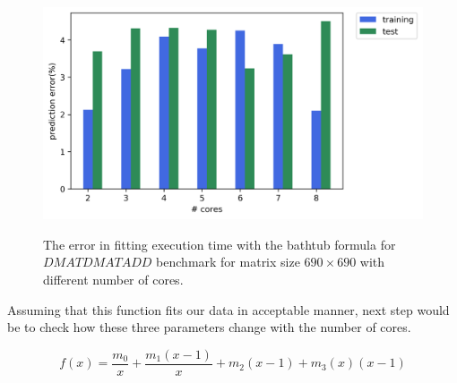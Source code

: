 \vspace{\baselineskip}	
\begin{figure}[H]
	\centering
	{\includegraphics[scale=.45]{images/bathtub/error_690.png}}	
	\caption{The error in fitting execution time with the bathtub formula for $DMATDMATADD$ benchmark for matrix size $690\times690$ with different number of cores.}	
	\label{fig23}
\end{figure}

\vspace{\baselineskip}	
Assuming that this function fits our data in acceptable manner, next step would be to check how these three parameters change with the number of cores.

\begin{equation}\label{usl_fit}
f(x)=\frac{m_0}{x}+\frac{m_1(x-1)}{x}+m_2(x-1)+m_3(x)(x-1)
\end{equation}


